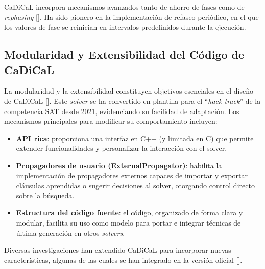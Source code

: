 CaDiCaL incorpora mecanismos avanzados tanto de ahorro de fases como de \textit{rephasing} [\cite{cadical2024}].
Ha sido pionero en la implementación de refaseo periódico, en el que los valores de fase se reinician en intervalos predefinidos durante la ejecución. 



\subsection{Modularidad y Extensibilidad del Código de CaDiCaL}
La modularidad y la extensibilidad constituyen objetivos esenciales en el diseño de CaDiCaL [\cite{cadical2024}].
Este \textit{solver} se ha convertido en plantilla para el ``\textit{hack track}'' de la competencia SAT desde 2021, evidenciando su facilidad de adaptación. Los mecanismos principales para modificar su comportamiento incluyen:
\begin{itemize}
  \item \textbf{API rica}: proporciona una interfaz en C++ (y limitada en C) que permite extender funcionalidades y personalizar la interacción con el solver.
  \item \textbf{Propagadores de usuario (ExternalPropagator)}: habilita la implementación de propagadores externos capaces de importar y exportar cláusulas aprendidas o sugerir decisiones al solver, otorgando control directo sobre la búsqueda.
  \item \textbf{Estructura del código fuente}: el código, organizado de forma clara y modular, facilita su uso como modelo para portar e integrar técnicas de última generación en otros \textit{solvers}.
\end{itemize}
Diversas investigaciones han extendido CaDiCaL para incorporar nuevas características, algunas de las cuales se han integrado en la versión oficial [\cite{cadical2024}].

